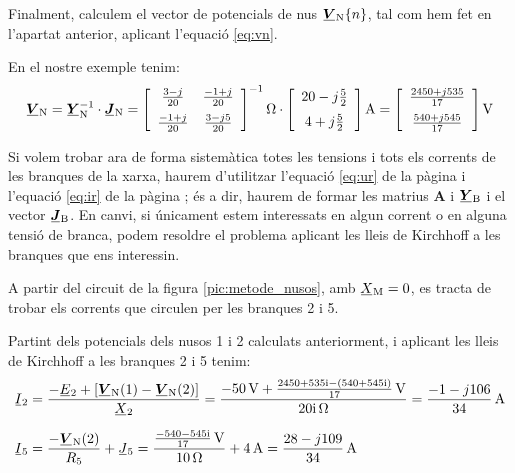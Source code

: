 Finalment,
calculem el vector de potencials de nus $\mcmplx{V}\ped{N}\{n\}$, tal
com  hem fet en l'apartat anterior, aplicant l'equació \eqref{eq:vn}.

En el nostre exemple tenim:
\[
   \mcmplx{V}\ped{N} = \mcmplx{Y}\ped{N}^{-1} \cdot \mcmplx{J}\ped{N} =
   \begin{bmatrix}\begin{array}{cc}
         \frac{3 - j}{20}  & \frac{-1 + j}{20} \\[2mm]
         \frac{-1 + j}{20} & \frac{3 - j 5}{20}
   \end{array}\end{bmatrix} ^{-1}\unit{\ohm} \cdot
   \begin{bmatrix}\begin{array}{c}
            20 - j \frac{5}{2} \\[2mm]
            4 + j \frac{5}{2}
   \end{array}\end{bmatrix}\unit{A} =
   \begin{bmatrix}\begin{array}{c}
         \frac{2450 + j 535}{17} \\[2mm]
         \frac{540  + j 545}{17}
   \end{array}\end{bmatrix}\unit{V}
\]

Si volem trobar ara de forma sistemàtica totes les tensions i tots
els corrents   de les branques de la xarxa, haurem d'utilitzar
l'equació \eqref{eq:ur} de la pàgina \pageref{eq:ur} i l'equació
\eqref{eq:ir} de la pàgina \pageref{eq:ir}; és a dir, haurem
de formar les matrius $\boldsymbol{A}$ i $\mcmplx{Y}\ped{B}$ i el
vector $\mcmplx{J}\ped{B}$. En canvi, si únicament estem
interessats en algun corrent o en alguna tensió de branca, podem
resoldre el problema aplicant les lleis de Kirchhoff a les branques
que ens interessin.

	
\begin{exemple}\label{ex:XarxaSenseAcobl}
	\addcontentsxms{\XarxaSenseAcobl}
    A partir del circuit de la figura \vref{pic:metode_nusos}, amb
    $\cmplx{X}\ped{M}=0$, es tracta de trobar els corrents que circulen
    per les branques 2 i 5.

    Partint dels potencials dels nusos 1 i 2 calculats anteriorment, i
    aplicant les lleis de Kirchhoff a les branques 2 i 5 tenim:
    \begin{align*}
       \cmplx{I}_2 &= \frac{-\cmplx{E}_2 + [\mcmplx{V}\ped{N}(1) - \mcmplx{V}\ped{N}(2)]}
                      {\cmplx{X}_2} = \frac{\qty{-50}{V} + \frac{\complexnum{2450+j535} - (\complexnum{540+
                      j545})}{17}\,\unit{V}}{\complexqty{j20}{\ohm}} = \frac{-1 - j 106}{34}\unit{\,A} \\[1.5ex]
       \cmplx{I}_5 &=  \frac{- \mcmplx{V}\ped{N}(2)}{R_5}  + \cmplx{J}_5 =                       \frac{\frac{\complexnum{-540-j545}}{17}\,\unit{V}}{\qty{10}{\ohm}} + \qty{4}{A} = \frac{28 - j 109}{34}\unit{\,A}
    \end{align*}
\end{exemple}

